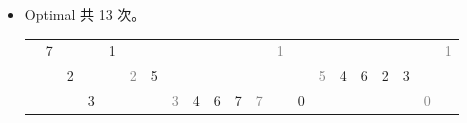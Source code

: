 \documentclass[12pt,a4paper]{article}
\newenvironment{problems}{\begin{list}{}{\renewcommand{\makelabel}[1]{\textbf{##1}\hfil}}}{\end{list}}
\begin{document}
\begin{problems}
\begin{itemize}
        \item Optimal 共 13 次。
        
        \begin{tabular}{c|cccccccccccccccccccc}
            &7& & &1& & & & & & & &\textcolor{gray}{1}& & & & & & & &\textcolor{gray}{1}\\
            & &2& & &\textcolor{gray}{2}&5& & & & & & & &\textcolor{gray}{5}&4&6&2&3& & \\
            & & &3& & & &\textcolor{gray}{3}&4&6&7&\textcolor{gray}{7}& &0& & & & & &\textcolor{gray}{0}& 
        \end{tabular}
    \end{itemize}
\end{problems}
\end{document}
